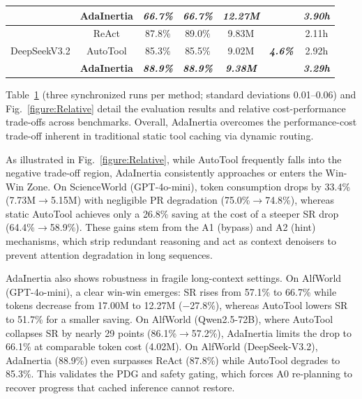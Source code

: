 \documentclass[runningheads]{llncs}
\begin{document}
\begin{table}[htb]
\begin{tabular}{lcccccc}
& \textbf{AdaInertia} & \textsl{\textbf{66.7\%}} & \textsl{\textbf{66.7\%}} & \textsl{\textbf{12.27M}} &  & \textsl{\textbf{3.90h}}\\
\midrule
\multirow{3}{*}{DeepSeekV3.2} & ReAct & 87.8\% & 89.0\% & 9.83M & \multirow{3}{*}{\textsl{\textbf{4.6\%}}} & 2.11h\\
& AutoTool & 85.3\% & 85.5\% & 9.02M &  & 2.92h\\
& \textbf{AdaInertia} & \textsl{\textbf{88.9\%}} & \textsl{\textbf{88.9\%}} & \textsl{\textbf{9.38M}} &  & \textsl{\textbf{3.29h}}\\
\bottomrule
\end{tabular}
\vspace{-2mm}
\label{table1}
\end{table}
Table~\ref{table1} (three synchronized runs per method; standard deviations 0.01--0.06) and Fig.~\ref{figure:Relative} detail the evaluation results and relative cost-performance trade-offs across benchmarks. Overall, AdaInertia overcomes the performance-cost trade-off inherent in traditional static tool caching via dynamic routing.

As illustrated in Fig.~\ref{figure:Relative}, while AutoTool frequently falls into the negative trade-off region, AdaInertia consistently approaches or enters the Win-Win Zone. On ScienceWorld (GPT-4o-mini), token consumption drops by 33.4\% (7.73M$\rightarrow$5.15M) with negligible PR degradation (75.0\%$\rightarrow$74.8\%), whereas static AutoTool achieves only a 26.8\% saving at the cost of a steeper SR drop (64.4\%$\rightarrow$58.9\%). These gains stem from the A1 (bypass) and A2 (hint) mechanisms, which strip redundant reasoning and act as context denoisers to prevent attention degradation in long sequences.

AdaInertia also shows robustness in fragile long-context settings. On AlfWorld (GPT-4o-mini), a clear win-win emerges: SR rises from 57.1\% to 66.7\% while tokens decrease from 17.00M to 12.27M ($-$27.8\%), whereas AutoTool lowers SR to 51.7\% for a smaller saving. On AlfWorld (Qwen2.5-72B), where AutoTool collapses SR by nearly 29 points (86.1\%$\rightarrow$57.2\%), AdaInertia limits the drop to 66.1\% at comparable token cost (4.02M). On AlfWorld (DeepSeek-V3.2), AdaInertia (88.9\%) even surpasses ReAct (87.8\%) while AutoTool degrades to 85.3\%. This validates the PDG and safety gating, which forces A0 re-planning to recover progress that cached inference cannot restore.
\end{document}
